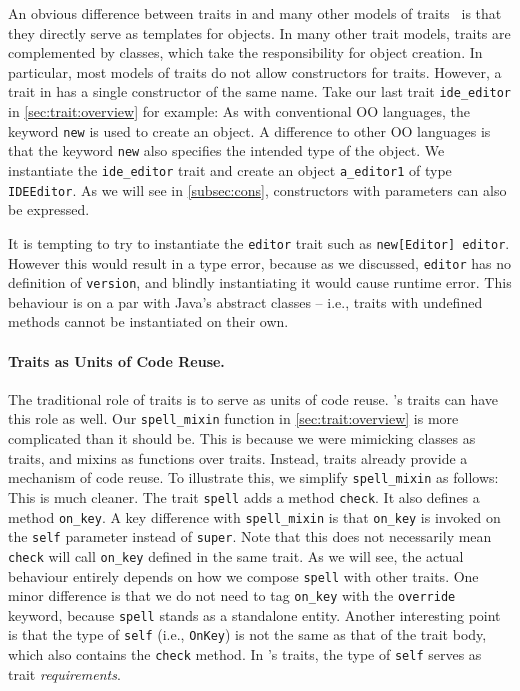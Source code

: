 An obvious difference between traits in \sedel and many other models of
traits~\citep{scharli2003traits,fisher2004typed,odersky2005scalable} is that they
directly serve as templates for objects. In many other trait models, traits are
complemented by classes, which take the responsibility for object creation. In
particular, most models of traits do not allow constructors for traits. However,
a trait in \sedel has a single constructor of the same name. Take our last trait
\lstinline{ide_editor} in \cref{sec:trait:overview} for example:
As with conventional OO languages, the keyword \lstinline{new} is used to create
an object. A difference to other OO languages is that the keyword
\lstinline{new} also specifies the intended type of the object. We instantiate
the \lstinline{ide_editor} trait and create an object \lstinline{a_editor1} of
type \lstinline{IDEEditor}. As we will see in \cref{subsec:cons}, constructors
with parameters can also be expressed.

It is tempting to try to instantiate the \lstinline{editor} trait such as
\lstinline{new[Editor] editor}. However this would result in a type error, because as
we discussed, \lstinline{editor} has no definition of \lstinline{version}, and
blindly instantiating it would cause runtime error. This behaviour is on a par
with Java's abstract classes -- i.e., traits with undefined methods cannot be instantiated on their own.

\paragraph{Traits as Units of Code Reuse.}
The traditional role of traits is to serve as units of code reuse. \sedel's traits
can have this role as well.
Our \lstinline{spell_mixin} function in \cref{sec:trait:overview} is more complicated than it should be.
This is because we were mimicking classes as traits, and
mixins as functions over traits. Instead, traits already provide a mechanism of
code reuse. To illustrate this, we simplify \lstinline{spell_mixin} as follows:
This is much cleaner. The trait \lstinline{spell} adds a method
\lstinline{check}. It also defines a method \lstinline{on_key}.
A key difference with \lstinline{spell_mixin} is that \lstinline{on_key} is invoked on the \lstinline{self}
parameter instead of \lstinline{super}. Note that this does not necessarily mean \lstinline{check} will call \lstinline{on_key}
defined in the same trait. As we will see, the actual behaviour entirely depends on how we compose \lstinline{spell}
with other traits. One minor difference is that we do not need to tag \lstinline{on_key}
with the \lstinline{override} keyword, because \lstinline{spell} stands as a standalone entity.
Another interesting point is that the type of \lstinline{self} (i.e., \lstinline{OnKey})
is not the same as that of the trait body, which also contains the \lstinline{check} method.
In \sedel's traits, the type of \lstinline{self} serves as trait \emph{requirements}.


